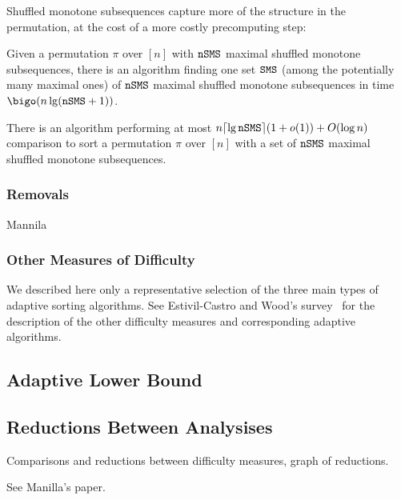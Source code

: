 Shuffled monotone subsequences capture more of the structure in the
permutation, at the cost of a more costly precomputing step:
\begin{lemma}
  Given a permutation $\pi$ over $[n]$ with $\mathtt{nSMS}$ maximal shuffled
  monotone subsequences, there is an algorithm finding one set $\mathtt{SMS}$
  (among the potentially many maximal ones) of $\mathtt{nSMS}$ maximal
  shuffled monotone subsequences in time $\bigo(n\lg(\nSMS+1))$.
\end{lemma}

\begin{theorem}
  There is an algorithm performing at most $n
  \lceil\lg\mathtt{nSMS}\rceil(1+o(1)) +O(\log n)$ comparison to sort a
  permutation $\pi$ over $[n]$ with a set of $\mathtt{nSMS}$ maximal shuffled
  monotone subsequences.  
\end{theorem}


\subsubsection{Removals}
\label{sec:removals}

Mannila~\cite{measuresOfPresortednessAndOptimalSortingAlgorithms}

\subsubsection{Other Measures of Difficulty}
\label{sec:other-meas-diff}

We described here only a representative selection of the three main
types of adaptive sorting algorithms.
%
See Estivil-Castro and Wood's survey~\cite{estivillcastro92survey} for
the description of the other difficulty measures and corresponding
adaptive algorithms.




\subsection{Adaptive Lower Bound}
\label{sec:adaptive-lower-bound}


\subsection{Reductions Between Analysises}
\label{sec:reduct-betw-analys}


Comparisons and reductions between difficulty measures, graph of
reductions.

See Manilla's paper.








